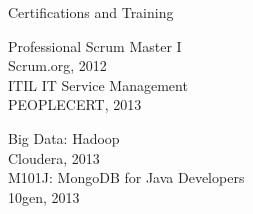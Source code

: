 \documentclass{resume} %
\begin{document}

\begin{rSection}{Certifications and Training}

\begin{minipage}[t]{0.5\textwidth}
Professional Scrum Master I \\
Scrum.org, 2012 \smallskip \\
ITIL IT Service Management \\
PEOPLECERT, 2013
\end{minipage}
\begin{minipage}[t]{0.45\textwidth}
Big Data: Hadoop \\
Cloudera, 2013 \smallskip \\
M101J: MongoDB for Java Developers \\
10gen, 2013
\end{minipage}

\end{rSection}
\end{document}

